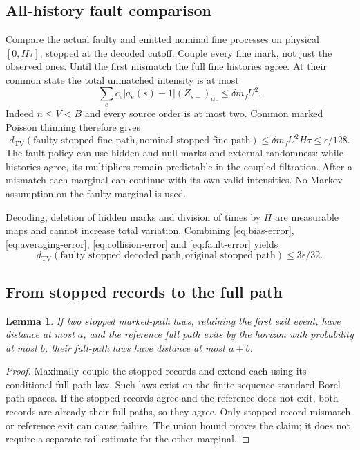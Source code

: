 \documentclass[11pt,reqno]{amsart}
\newtheorem{lemma}[theorem]{Lemma}
\theoremstyle{definition}
\theoremstyle{remark}
\newcommand{\TV}{d_{\mathrm{TV}}}
\begin{document}
\subsection{All-history fault comparison}
Compare the actual faulty and emitted nominal fine processes on physical
$[0,H\tau]$, stopped at the decoded cutoff. Couple every fine mark, not just
the observed ones. Until the first mismatch the full fine histories agree.
At their common state the total unmatched intensity is at most
\[
 \sum_e c_e|a_e(s)-1|(Z_{s-})_{\alpha_e}
 \le\delta m_fU^2.
\]
Indeed $n\le V<B$ and every source order is at most two. Common marked
Poisson thinning therefore gives
\begin{equation}\label{eq:fault-error}
 \TV(\text{faulty stopped fine path},\text{nominal stopped fine path})
 \le\delta m_fU^2H\tau\le\epsilon/128.
\end{equation}
The fault policy can use hidden and null marks and external randomness:
while histories agree, its multipliers remain predictable in the coupled
filtration. After a mismatch each marginal can continue with its own valid
intensities. No Markov assumption on the faulty marginal is used.

Decoding, deletion of hidden marks and division of times by $H$ are measurable
maps and cannot increase total variation. Combining
\eqref{eq:bias-error}, \eqref{eq:averaging-error}, \eqref{eq:collision-error}
and \eqref{eq:fault-error} yields
\begin{equation}\label{eq:stopped-total}
 \TV(\text{faulty stopped decoded path},\text{original stopped path})
 \le3\epsilon/32.
\end{equation}

\subsection{From stopped records to the full path}
\begin{lemma}\label{lem:unstopping}
If two stopped marked-path laws, retaining the first exit event, have distance
at most $a$, and the reference full path exits by the horizon with probability
at most $b$, their full-path laws have distance at most $a+b$.
\end{lemma}
\begin{proof}
Maximally couple the stopped records and extend each using its conditional
full-path law. Such laws exist on the finite-sequence standard Borel path
spaces. If the stopped records agree and the reference does not exit, both
records are already their full paths, so they agree. Only stopped-record
mismatch or reference exit can cause failure. The union bound proves the
claim; it does not require a separate tail estimate for the other marginal.
\end{proof}
\end{document}
